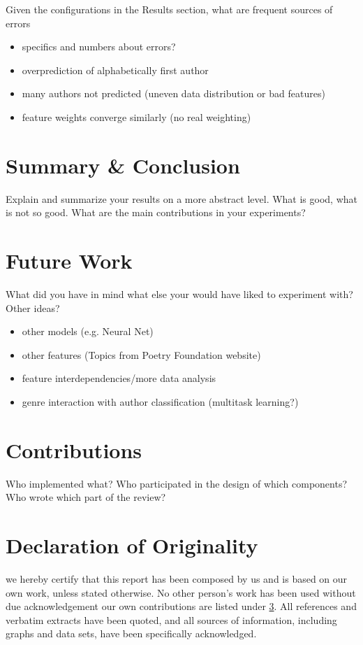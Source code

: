 \documentclass[11pt]{article}
\begin{document}
Given the configurations in the Results section, what are frequent sources of errors
\begin{itemize}
\item specifics and numbers about errors?
\item overprediction of alphabetically first author
\item many authors not predicted (uneven data distribution or bad features)
\item feature weights converge similarly (no real weighting)
\end{itemize}

\section{Summary \& Conclusion}

Explain and summarize your results on a more abstract level. What is good, what is not so
good. What are the main contributions in your experiments?


\section{Future Work}

What did you have in mind what else your
would have liked to experiment with? Other ideas?
\begin{itemize}
\item other models (e.g. Neural Net)
\item other features (Topics from Poetry Foundation website)
\item feature interdependencies/more data analysis
\item genre interaction with author classification (multitask learning?)
\end{itemize}





\appendix

\section{Contributions}\label{sec:cont}
Who implemented what?
Who participated in the design of which components?
Who wrote which part of the review?
\section{Declaration of Originality}
we hereby certify that this report has been composed by us and is based on our own work, unless 
stated otherwise. No other person’s work has been used without due acknowledgement our own contributions 
are listed under \ref{sec:cont}. All references and verbatim extracts have been quoted, and all 
sources of information, including graphs and data sets, have been specifically acknowledged.
\end{document}
